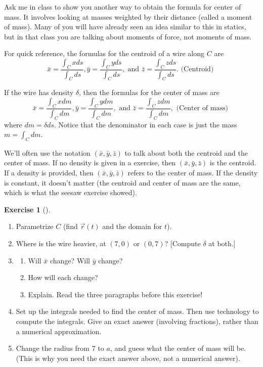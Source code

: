 \documentclass[10pt,]{book}
\theoremstyle{plain}
\theoremstyle{definition}
\theoremstyle{definition}
\theoremstyle{definition}
\theoremstyle{definition}
\newtheorem{exploration}[project]{Exercise}
\theoremstyle{definition}
\numberwithin{equation}{section}
\begin{document}
Ask me in class to show you another way to obtain the formula for center of mass. It involves looking at masses weighted by their distance (called a moment of mass). Many of you will have already seen an idea similar to this in statics, but in that class you are talking about moments of force, not moments of mass.%
\par
For quick reference, the formulas for the centroid of a wire along \(C\) are%
\begin{equation*}
\bar x = \frac{\int_C x ds}{\int_C  ds},
\bar y = \frac{\int_C y ds}{\int_C  ds}, 
\text{ and } 
\bar z = \frac{\int_C z ds}{\int_C  ds}.  \text{ (Centroid) }
\end{equation*}
%
\par
If the wire has density \(\delta\), then the formulas for the center of mass are %
\begin{equation*}
\bar x = \frac{\int_C x dm}{\int_C  dm},
\bar y = \frac{\int_C y dm}{\int_C  dm}, 
\text{ and } 
\bar z = \frac{\int_C z dm}{\int_C  dm},  \text{ (Center of mass) }
\end{equation*}
where \(dm=\delta ds\). Notice that the denominator in each case is just the mass \(m=\int_C dm\).%
\par
We'll often use the notation \((\bar x, \bar y,\bar z)\) to talk about both the centroid and the center of mass. If no density is given in a exercise, then \((\bar x, \bar y,\bar z)\) is the centroid. If a density is provided, then \((\bar x, \bar y,\bar z)\) refers to the center of mass. If the density is constant, it doesn't matter (the centroid and center of mass are the same, which is what the seesaw exercise showed).%
\begin{exploration}[]\label{exploration-223}
\leavevmode%
\begin{enumerate}[font=\bfseries,label=(\alph*),ref=\alph*]
\item\label{task-577} Parametrize \(C\) (find \(\vec r(t)\) and the domain for \(t\)).%
\item\label{task-578} Where is the wire heavier, at \((7,0)\) or \((0,7)\)? [Compute \(\delta\) at both.]%
\item\label{task-579} \begin{enumerate}[font=\bfseries,label=(\roman*),ref=\theenumi.\roman*]
\item\label{task-580} Will \(\bar x\) change? Will \(\bar y\) change?%
\item\label{task-581} How will each change?%
\item\label{task-582} Explain. Read the three paragraphs before this exercise!%
%
\end{enumerate}
\item\label{task-583} Set up the integrals needed to find the center of mass. Then use technology to compute the integrals. Give an exact answer (involving fractions), rather than a numerical approximation.%
\item\label{task-584} Change the radius from 7 to \(a\), and guess what the center of mass will be.  (This is why you need the exact answer above, not a numerical answer).%
\end{enumerate}
\end{exploration}
\end{document}
